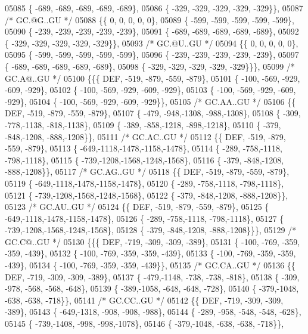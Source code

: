 \begin{DoxyCode}
05085 \{ -689, -689, -689, -689, -689\},
05086 \{ -329, -329, -329, -329, -329\}\},
05087 \textcolor{comment}{/* GC.@G..GU */}
05088 \{\{    0,    0,    0,    0,    0\},
05089 \{ -599, -599, -599, -599, -599\},
05090 \{ -239, -239, -239, -239, -239\},
05091 \{ -689, -689, -689, -689, -689\},
05092 \{ -329, -329, -329, -329, -329\}\},
05093 \textcolor{comment}{/* GC.@U..GU */}
05094 \{\{    0,    0,    0,    0,    0\},
05095 \{ -599, -599, -599, -599, -599\},
05096 \{ -239, -239, -239, -239, -239\},
05097 \{ -689, -689, -689, -689, -689\},
05098 \{ -329, -329, -329, -329, -329\}\}\},
05099 \textcolor{comment}{/* GC.A@..GU */}
05100 \{\{\{  DEF, -519, -879, -559, -879\},
05101 \{ -100, -569, -929, -609, -929\},
05102 \{ -100, -569, -929, -609, -929\},
05103 \{ -100, -569, -929, -609, -929\},
05104 \{ -100, -569, -929, -609, -929\}\},
05105 \textcolor{comment}{/* GC.AA..GU */}
05106 \{\{  DEF, -519, -879, -559, -879\},
05107 \{ -479, -948,-1308, -988,-1308\},
05108 \{ -309, -778,-1138, -818,-1138\},
05109 \{ -389, -858,-1218, -898,-1218\},
05110 \{ -379, -848,-1208, -888,-1208\}\},
05111 \textcolor{comment}{/* GC.AC..GU */}
05112 \{\{  DEF, -519, -879, -559, -879\},
05113 \{ -649,-1118,-1478,-1158,-1478\},
05114 \{ -289, -758,-1118, -798,-1118\},
05115 \{ -739,-1208,-1568,-1248,-1568\},
05116 \{ -379, -848,-1208, -888,-1208\}\},
05117 \textcolor{comment}{/* GC.AG..GU */}
05118 \{\{  DEF, -519, -879, -559, -879\},
05119 \{ -649,-1118,-1478,-1158,-1478\},
05120 \{ -289, -758,-1118, -798,-1118\},
05121 \{ -739,-1208,-1568,-1248,-1568\},
05122 \{ -379, -848,-1208, -888,-1208\}\},
05123 \textcolor{comment}{/* GC.AU..GU */}
05124 \{\{  DEF, -519, -879, -559, -879\},
05125 \{ -649,-1118,-1478,-1158,-1478\},
05126 \{ -289, -758,-1118, -798,-1118\},
05127 \{ -739,-1208,-1568,-1248,-1568\},
05128 \{ -379, -848,-1208, -888,-1208\}\}\},
05129 \textcolor{comment}{/* GC.C@..GU */}
05130 \{\{\{  DEF, -719, -309, -309, -389\},
05131 \{ -100, -769, -359, -359, -439\},
05132 \{ -100, -769, -359, -359, -439\},
05133 \{ -100, -769, -359, -359, -439\},
05134 \{ -100, -769, -359, -359, -439\}\},
05135 \textcolor{comment}{/* GC.CA..GU */}
05136 \{\{  DEF, -719, -309, -309, -389\},
05137 \{ -479,-1148, -738, -738, -818\},
05138 \{ -309, -978, -568, -568, -648\},
05139 \{ -389,-1058, -648, -648, -728\},
05140 \{ -379,-1048, -638, -638, -718\}\},
05141 \textcolor{comment}{/* GC.CC..GU */}
05142 \{\{  DEF, -719, -309, -309, -389\},
05143 \{ -649,-1318, -908, -908, -988\},
05144 \{ -289, -958, -548, -548, -628\},
05145 \{ -739,-1408, -998, -998,-1078\},
05146 \{ -379,-1048, -638, -638, -718\}\},

\end{DoxyCode}
